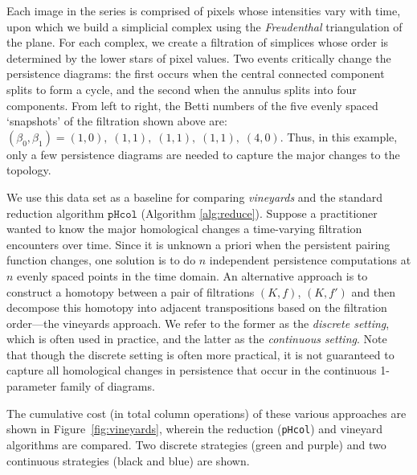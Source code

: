 \documentclass[sn-mathphys]{sn-jnl}
\begin{document}
Each image in the series is comprised of pixels whose intensities vary with time, upon which we build a simplicial complex using the \emph{Freudenthal} triangulation of the plane. For each complex, we create a filtration of simplices whose order is determined by the lower stars of pixel values.   
Two events critically change the persistence diagrams: the first occurs when the central connected component splits to form a cycle, and the second  when the annulus  splits into four components. 
From left to right, the Betti numbers of the five evenly spaced `snapshots' of the filtration shown above are: $(\beta_0,\beta_1)  = (1,0), \; (1,1),  \; (1,1), \; (1,1), \; (4,0)$.
Thus, in this example, only a few persistence diagrams are needed to capture the major changes to the topology. 

We use this data set as a baseline for comparing \emph{vineyards} and the standard reduction algorithm $\texttt{pHcol}$ (Algorithm \ref{alg:reduce}). Suppose a practitioner wanted to know the major homological changes a time-varying filtration encounters over time.
Since it is unknown a priori when the persistent pairing function changes, one solution is to do $n$ independent persistence computations at $n$ evenly spaced points in the time domain.  An alternative approach is to construct a homotopy between a pair of filtrations $(K, f)$, $(K,f')$ and then decompose this homotopy into adjacent transpositions based on the filtration order---the vineyards approach. 
 We refer to the former as the \emph{discrete setting}, which is often used in practice, and the  latter as the \emph{continuous setting}. Note that though the discrete setting is often more practical, it is not guaranteed to capture all homological changes in persistence that occur in the continuous 1-parameter family of diagrams.  

The cumulative cost (in total column operations) of these various approaches are shown in Figure~\ref{fig:vineyards}, wherein the reduction (\texttt{pHcol}) and vineyard algorithms are compared. Two discrete strategies (green and purple) and two continuous strategies (black and blue) are shown.
\end{document}
